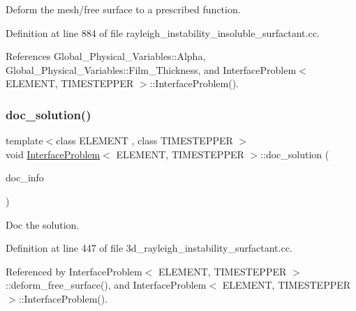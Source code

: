 Deform the mesh/free surface to a prescribed function. 



Definition at line 884 of file rayleigh\+\_\+instability\+\_\+insoluble\+\_\+surfactant.\+cc.



References Global\+\_\+\+Physical\+\_\+\+Variables\+::\+Alpha, Global\+\_\+\+Physical\+\_\+\+Variables\+::\+Film\+\_\+\+Thickness, and Interface\+Problem$<$ E\+L\+E\+M\+E\+N\+T, T\+I\+M\+E\+S\+T\+E\+P\+P\+E\+R $>$\+::\+Interface\+Problem().

\mbox{\label{classInterfaceProblem_a49714e35e94f7d2af0b6ddd22b851f52}} 
\subsubsection{\texorpdfstring{doc\+\_\+solution()}{doc\_solution()}\hspace{0.1cm}{\footnotesize\ttfamily [1/3]}}
{\footnotesize\ttfamily template$<$class E\+L\+E\+M\+E\+NT , class T\+I\+M\+E\+S\+T\+E\+P\+P\+ER $>$ \\
void \hyperlink{classInterfaceProblem}{Interface\+Problem}$<$ E\+L\+E\+M\+E\+NT, T\+I\+M\+E\+S\+T\+E\+P\+P\+ER $>$\+::doc\+\_\+solution (\begin{DoxyParamCaption}\item[{Doc\+Info \&}]{doc\+\_\+info }\end{DoxyParamCaption})}



Doc the solution. 



Definition at line 447 of file 3d\+\_\+rayleigh\+\_\+instability\+\_\+surfactant.\+cc.



Referenced by Interface\+Problem$<$ E\+L\+E\+M\+E\+N\+T, T\+I\+M\+E\+S\+T\+E\+P\+P\+E\+R $>$\+::deform\+\_\+free\+\_\+surface(), and Interface\+Problem$<$ E\+L\+E\+M\+E\+N\+T, T\+I\+M\+E\+S\+T\+E\+P\+P\+E\+R $>$\+::\+Interface\+Problem().

\mbox{\label{classInterfaceProblem_a49714e35e94f7d2af0b6ddd22b851f52}} 
